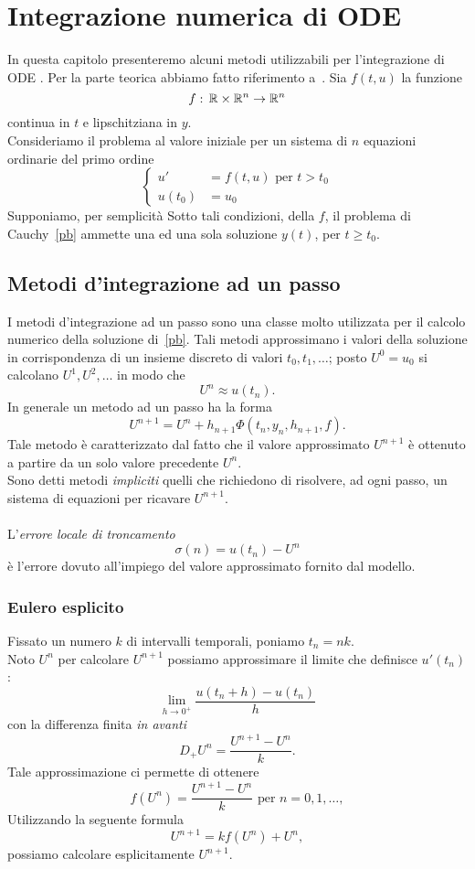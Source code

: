 \chapter{Integrazione numerica di ODE}
In questa capitolo presenteremo alcuni  metodi utilizzabili per l'integrazione  di ODE .  Per la parte teorica abbiamo fatto riferimento a~\cite[Capitoli 5-8]{LeVeque}. 
Sia $f(t,u)$ la funzione
$$ f:\, \mathbb{R} \times \mathbb{R}^n \to \mathbb{R}^n$$
continua in $t$ e lipschitziana in $y$.\\
Consideriamo il problema al valore iniziale per un sistema di $n$ equazioni ordinarie del primo ordine
$$ \label{pb}\begin{cases} u'&= f(t,u) \text{ per } t>t_0\\
 u(t_0) &= u_0	
 \end{cases}$$ 
Supponiamo, per semplicit\`a 
 Sotto tali condizioni, della $f$, il problema di Cauchy~\eqref{pb} ammette una ed una sola soluzione $y(t)$, per $t\geq t_0$. 
 \section{Metodi d'integrazione ad un passo}
I metodi d'integrazione ad un passo sono una  classe  molto utilizzata per il calcolo numerico della soluzione di~\eqref{pb}. Tali metodi approssimano i valori della soluzione in corrispondenza di un insieme discreto di valori $t_0, t_1, \dots$; posto  $U^0 = u_0$  si calcolano $U^1, U^2, \dots$  in modo che $$U^n \approx u\left(t_n\right).$$ 
In generale un metodo ad un passo ha la forma
 $$ U^{n+1} = U^n   + h_{n+1} \Phi\left( t_n, y_n ,  h_{n+1},f\right).$$
Tale metodo \`e caratterizzato dal fatto che il valore approssimato $U^{n+1}$ \`e ottenuto a partire da un solo valore precedente $U^n$.\\
Sono detti metodi \textit{impliciti} quelli che richiedono di risolvere, ad ogni passo,  un sistema di equazioni per ricavare $U^{n+1}$.\\ \\
L'\textit{errore locale di troncamento}  
$$ \sigma(n) = u(t_n) -U^n $$ 
\`e l'errore dovuto all'impiego del valore approssimato fornito dal modello.  

 \subsection{Eulero esplicito}
Fissato un numero $k$ di intervalli temporali, poniamo 
$t_n = nk$.\\ 
Noto $U^n$ per calcolare $U^{n+1}$ possiamo approssimare  il limite che definisce $u'\left(t_n\right)$:
$$ \lim_{h\to 0^+} \frac{u\left(t_n + h\right) - u\left(t_n\right)}{h}$$ 
con la differenza finita \emph{in avanti}
$$ D_+ U^n = \frac{U^{n+1}-U^n}{k}.$$
Tale approssimazione ci permette di ottenere
$$ f\left(U^n\right) = \frac{U^{n+1}-U^n}{k} \text{ per } n=0, 1, \dots, $$
Utilizzando la seguente formula
$$ U^{n+1} = k f\left(U^n\right) + U^n,$$
possiamo calcolare esplicitamente $U^{n+1}$.
